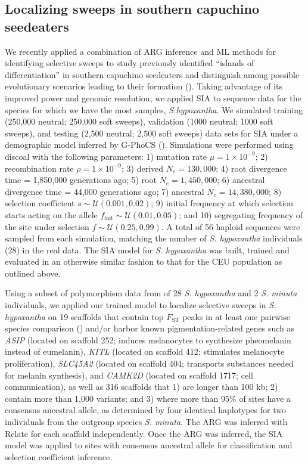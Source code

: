 \subsection{Localizing sweeps in southern capuchino seedeaters}
We recently applied a combination of \ac{ARG} inference and \ac{ML} methods for identifying selective sweeps to study previously identified “islands of differentiation” in southern capuchino seedeaters and distinguish among possible evolutionary scenarios leading to their formation (\cite{hejase_genomic_2020}). Taking advantage of its improved power and genomic resolution, we applied \ac{SIA} to sequence data for the species for which we have the most samples, \textit{S.hypoxantha}. We simulated training (250,000 neutral; 250,000 soft sweeps), validation (1000 neutral; 1000 soft sweeps), and testing (2,500 neutral; 2,500 soft sweeps) data sets for \ac{SIA} under a demographic model inferred by G-PhoCS (\cite{campagna_distinguishing_2015}). Simulations were performed using discoal with the following parameters: 1) mutation rate $\mu = 1\times 10^{-9}$; 2) recombination rate $\rho = 1\times 10^{-9}$; 3) derived $N_e = 130,000$; 4) root divergence time = 1,850,000 generations ago; 5) root $N_e = 1,450,000$; 6) ancestral divergence time = 44,000 generations ago; 7) ancestral $N_e = 14,380,000$; 8) selection coefficient $s \sim \mathcal{U}(0.001, 0.02)$; 9) initial frequency at which selection starts acting on the allele $f_{\mathrm{init}} \sim \mathcal{U}(0.01, 0.05)$; and 10) segregating frequency of the site under selection $f \sim \mathcal{U}(0.25, 0.99)$. A total of 56 haploid sequences were sampled from each simulation, matching the number of \textit{S. hypoxantha} individuals (28) in the real data. The \ac{SIA} model for \textit{S. hypoxantha} was built, trained and evaluated in an otherwise similar fashion to that for the CEU population as outlined above.

Using a subset of polymorphism data from \cite{turbek_rapid_2021} of 28 \textit{S. hypoxantha} and 2 \textit{S. minuta} individuals, we applied our trained model to localize selective sweeps in \textit{S. hypoxantha} on 19 scaffolds that contain top $F_{\mathrm{ST}}$ peaks in at least one pairwise species comparison (\cite{campagna_repeated_2017}) and/or harbor known pigmentation-related genes such as \textit{ASIP} (located on scaffold 252; induces melanocytes to synthesize pheomelanin instead of eumelanin), \textit{KITL} (located on scaffold 412; stimulates melanocyte proliferation), \textit{SLC45A2} (located on scaffold 404; transports substances needed for melanin synthesis), and \textit{CAMK2D} (located on scaffold 1717; cell communication), as well as 316 scaffolds that 1) are longer than 100 kb; 2) contain more than 1,000 variants; and 3) where more than 95\% of sites have a consensus ancestral allele, as determined by four identical haplotypes for two individuals from the outgroup species \textit{S. minuta}. The \ac{ARG} was inferred with Relate for each scaffold independently. Once the \ac{ARG} was inferred, the \ac{SIA} model was applied to sites with consensus ancestral allele for classification and selection coefficient inference.

